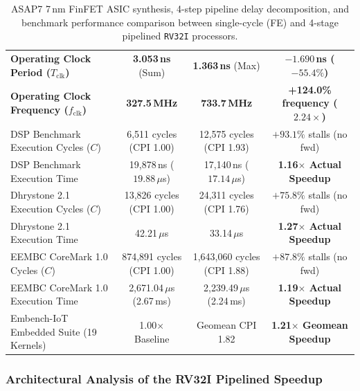 \begin{table}[htbp]
{\begin{tabular}{|l|c|c|c|}
\hline
\textbf{Operating Clock Period ($T_{\text{clk}}$)} & \textbf{3.053\,ns} (Sum)  & \textbf{1.363\,ns} (Max)    & \textbf{$-1.690$\,ns ($-55.4\%$)} \\
\textbf{Operating Clock Frequency ($f_{\text{clk}}$)} & \textbf{327.5\,MHz}    & \textbf{733.7\,MHz}         & \textbf{+124.0\% frequency ($2.24\times$)} \\
\hline
DSP Benchmark Execution Cycles ($C$)           & 6,511 cycles (CPI 1.00)     & 12,575 cycles (CPI 1.93)    & $+93.1\%$ stalls (no fwd) \\
DSP Benchmark Execution Time                   & 19,878\,ns ($19.88\,\mu$s)  & 17,140\,ns ($17.14\,\mu$s)  & \textbf{1.16$\times$ Actual Speedup} \\
\hline
Dhrystone 2.1 Execution Cycles ($C$)           & 13,826 cycles (CPI 1.00)    & 24,311 cycles (CPI 1.76)    & $+75.8\%$ stalls (no fwd) \\
Dhrystone 2.1 Execution Time                   & 42.21\,$\mu$s               & 33.14\,$\mu$s               & \textbf{1.27$\times$ Actual Speedup} \\
\hline
EEMBC CoreMark 1.0 Cycles ($C$)                & 874,891 cycles (CPI 1.00)   & 1,643,060 cycles (CPI 1.88) & $+87.8\%$ stalls (no fwd) \\
EEMBC CoreMark 1.0 Execution Time              & 2,671.04\,$\mu$s (2.67\,ms) & 2,239.49\,$\mu$s (2.24\,ms) & \textbf{1.19$\times$ Actual Speedup} \\
\hline
Embench-IoT Embedded Suite (19 Kernels)        & 1.00$\times$ Baseline       & Geomean CPI 1.82            & \textbf{1.21$\times$ Geomean Speedup} \\
\hline
\end{tabular}%
}
\caption{ASAP7 7\,nm FinFET ASIC synthesis, 4-step pipeline delay decomposition, and benchmark performance comparison between single-cycle (FE) and 4-stage pipelined \texttt{RV32I} processors.}\label{tab:asap7_rv32i_synthesis}
\end{table}

\subsubsection{Architectural Analysis of the RV32I Pipelined Speedup}

